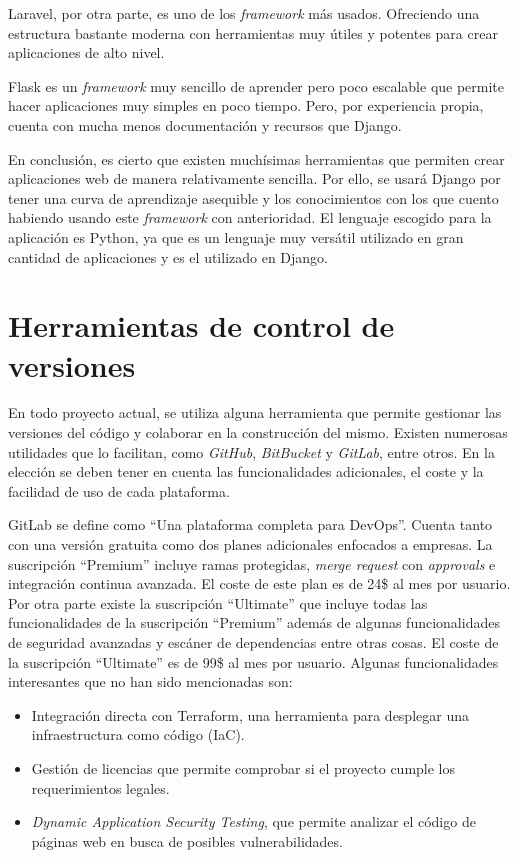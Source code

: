 Laravel, por otra parte, es uno de los \emph{framework} más usados. Ofreciendo una estructura bastante moderna con herramientas muy útiles y potentes para crear aplicaciones de alto nivel. 

Flask es un \emph{framework} muy sencillo de aprender pero poco escalable que permite hacer aplicaciones muy simples en poco tiempo. Pero, por experiencia propia, cuenta con mucha menos documentación y recursos que Django.

En conclusión, es cierto que existen muchísimas herramientas que permiten crear aplicaciones web de manera relativamente sencilla. Por ello, se usará Django por tener una curva de aprendizaje asequible y los conocimientos con los que cuento habiendo usando este \emph{framework} con anterioridad. El lenguaje escogido para la aplicación es Python, ya que es un lenguaje muy versátil utilizado en gran cantidad de aplicaciones y es el utilizado en Django. 

\section{Herramientas de control de versiones}
En todo proyecto actual, se utiliza alguna herramienta que permite gestionar las versiones del código y colaborar en la construcción del mismo. Existen numerosas utilidades que lo facilitan, como \emph{GitHub}, \emph{BitBucket} y \emph{GitLab}, entre otros. En la elección se deben tener en cuenta las funcionalidades adicionales, el coste y la facilidad de uso de cada plataforma.

GitLab se define como ``Una plataforma completa para DevOps''. Cuenta tanto con una versión gratuita como dos planes adicionales enfocados a empresas. La suscripción ``Premium'' incluye ramas protegidas, \emph{merge request} con \emph{approvals} e integración continua avanzada. El coste de este plan es de 24\$ al mes por usuario. Por otra parte existe la suscripción ``Ultimate'' que incluye todas las funcionalidades de la suscripción ``Premium'' además de algunas funcionalidades de seguridad avanzadas y escáner de dependencias entre otras cosas. El coste de la suscripción ``Ultimate'' es de 99\$ al mes por usuario. Algunas funcionalidades interesantes que no han sido mencionadas son:
\begin{itemize}
    \item Integración directa con Terraform, una herramienta para desplegar una infraestructura como código (IaC).
    \item Gestión de licencias que permite comprobar si el proyecto cumple los requerimientos legales. 
    \item \emph{Dynamic Application Security Testing}, que permite analizar el código de páginas web en busca de posibles vulnerabilidades.
\end{itemize}

